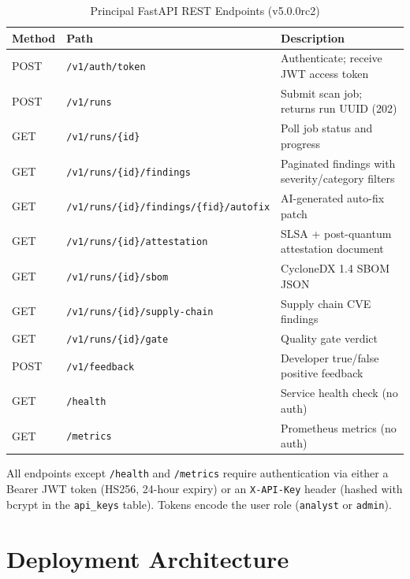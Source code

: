 \begin{table}[H]
\caption{Principal FastAPI REST Endpoints (v5.0.0rc2)}
\label{tab:api_endpoints}
\centering
\renewcommand{\arraystretch}{1.3}
\begin{tabularx}{\textwidth}{@{} l l X @{}}
\toprule
\textbf{Method} & \textbf{Path} & \textbf{Description} \\
\midrule
POST   & \texttt{/v1/auth/token}              & Authenticate; receive JWT access token \\
POST   & \texttt{/v1/runs}                    & Submit scan job; returns run UUID (202) \\
GET    & \texttt{/v1/runs/\{id\}}             & Poll job status and progress \\
GET    & \texttt{/v1/runs/\{id\}/findings}    & Paginated findings with severity/category filters \\
GET    & \texttt{/v1/runs/\{id\}/findings/\{fid\}/autofix} & AI-generated auto-fix patch \\
GET    & \texttt{/v1/runs/\{id\}/attestation} & SLSA + post-quantum attestation document \\
GET    & \texttt{/v1/runs/\{id\}/sbom}        & CycloneDX 1.4 SBOM JSON \\
GET    & \texttt{/v1/runs/\{id\}/supply-chain} & Supply chain CVE findings \\
GET    & \texttt{/v1/runs/\{id\}/gate}        & Quality gate verdict \\
POST   & \texttt{/v1/feedback}                & Developer true/false positive feedback \\
GET    & \texttt{/health}                     & Service health check (no auth) \\
GET    & \texttt{/metrics}                    & Prometheus metrics (no auth) \\
\bottomrule
\end{tabularx}
\end{table}

All endpoints except \texttt{/health} and \texttt{/metrics} require authentication via either a Bearer JWT token (HS256, 24-hour expiry) or an \texttt{X-API-Key} header (hashed with bcrypt in the \texttt{api\_keys} table). Tokens encode the user role (\texttt{analyst} or \texttt{admin}).

\section{Deployment Architecture}
\label{sec:deployment}

